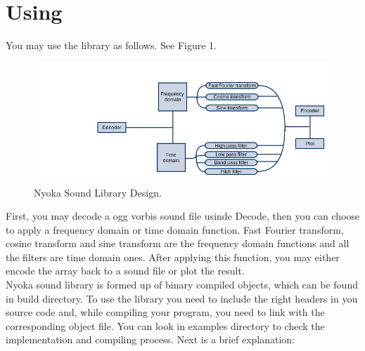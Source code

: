 \documentclass[letterpaper]{article}
\begin{document}
\section{Using}
You may use the library as follows. See Figure 1.
\begin{figure}
\centering
\includegraphics[width=1\textwidth]{diagrama_nyoka__1_.jpg}
\caption{\label{fig:libraryFlowDiagram}Nyoka Sound Library Design.}
\end{figure}

	First, you may decode a ogg vorbis sound file usinde Decode, then you can choose to apply a frequency domain or time domain function. Fast Fourier transform, cosine transform and sine transform are the frequency {}domain functions and all the filters are time domain ones. After applying this function, you may either encode the array back to a sound file or plot the result.\\
	Nyoka sound library is formed up of binary compiled objects,
which can be found in build directory. To use the library you need to
include the right headers in you source code and, while compiling your
program, you need to link with the corresponding object file. 
	You can look in examples directory to check the implementation
and compiling process. Next is a brief explanation:
\end{document}
